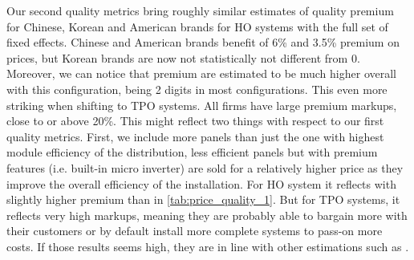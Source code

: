 Our second quality metrics bring roughly similar estimates of quality premium for Chinese, Korean and American brands for HO systems with the full set of fixed effects. Chinese and American brands benefit of 6\% and 3.5\% premium on prices, but Korean brands are now not statistically not different from 0. Moreover, we can notice that premium are estimated to be much higher overall with this configuration, being 2 digits in most configurations. This even more striking when shifting to TPO systems. All firms have large premium markups, close to or above 20\%. This might reflect two things with respect to our first quality metrics. First, we include more panels than just the one with highest module efficiency of the distribution, less efficient panels but with premium features (i.e. built-in micro inverter) are sold for a relatively higher price as they improve the overall efficiency of the installation. For HO system it reflects with slightly higher premium than in \autoref{tab:price_quality_1}. But for TPO systems, it reflects very high markups, meaning they are probably able to bargain more with their customers or by default install more complete systems to pass-on more costs. If those results seems high, they are in line with other estimations such as \citet{barboseTrackingSunPricing2019a}.

%
%

